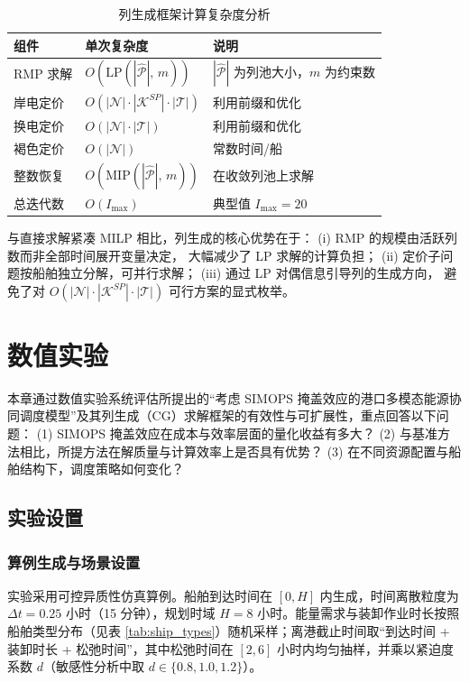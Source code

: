 \documentclass[UTF8, a4paper, 12pt]{ctexart}
\begin{document}
\begin{table}[htbp]
\centering
\caption{列生成框架计算复杂度分析}
\label{tab:complexity}
\begin{tabular}{lll}
\toprule
组件 & 单次复杂度 & 说明 \\
\midrule
RMP 求解 & $O(\text{LP}(|\hat{\mathcal{P}}|,\, m))$
  & $|\hat{\mathcal{P}}|$ 为列池大小，$m$ 为约束数 \\
岸电定价 & $O(|\mathcal{N}| \cdot |\mathcal{K}^{SP}| \cdot |\mathcal{T}|)$
  & 利用前缀和优化 \\
换电定价 & $O(|\mathcal{N}| \cdot |\mathcal{T}|)$
  & 利用前缀和优化 \\
褐色定价 & $O(|\mathcal{N}|)$
  & 常数时间/船 \\
整数恢复 & $O(\text{MIP}(|\hat{\mathcal{P}}|,\, m))$
  & 在收敛列池上求解 \\
\midrule
总迭代数 & $O(I_{\max})$
  & 典型值 $I_{\max} = 20$ \\
\bottomrule
\end{tabular}
\end{table}

\noindent
与直接求解紧凑 MILP 相比，列生成的核心优势在于：
(i) RMP 的规模由活跃列数而非全部时间展开变量决定，
大幅减少了 LP 求解的计算负担；
(ii) 定价子问题按船舶独立分解，可并行求解；
(iii) 通过 LP 对偶信息引导列的生成方向，
避免了对 $O(|\mathcal{N}| \cdot |\mathcal{K}^{SP}| \cdot |\mathcal{T}|)$
可行方案的显式枚举。



\section{数值实验}
\label{sec:computational}

本章通过数值实验系统评估所提出的“考虑 SIMOPS 掩盖效应的港口多模态能源协同调度模型”及其列生成（CG）求解框架的有效性与可扩展性，重点回答以下问题：
(1) SIMOPS 掩盖效应在成本与效率层面的量化收益有多大？
(2) 与基准方法相比，所提方法在解质量与计算效率上是否具有优势？
(3) 在不同资源配置与船舶结构下，调度策略如何变化？

\subsection{实验设置}
\label{sec:exp_setup}

\subsubsection{算例生成与场景设置}
\label{sec:data_instances}
实验采用可控异质性仿真算例。船舶到达时间在 $[0,H]$ 内生成，时间离散粒度为 $\Delta t=0.25$ 小时（15 分钟），规划时域 $H=8$ 小时。能量需求与装卸作业时长按照船舶类型分布（见表 \ref{tab:ship_types}）随机采样；离港截止时间取“到达时间 + 装卸时长 + 松弛时间”，其中松弛时间在 $[2,6]$ 小时内均匀抽样，并乘以紧迫度系数 $d$（敏感性分析中取 $d\in\{0.8,1.0,1.2\}$）。
\end{document}
